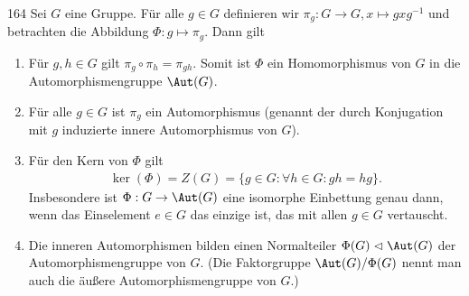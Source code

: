 \begin{algebraUE}{164}
Sei $G$ eine Gruppe. Für alle $g \in G$ definieren wir $\pi_g: G \rightarrow G, x \mapsto gxg^{-1}$
und betrachten die Abbildung $\Phi: g \mapsto \pi_g$. Dann gilt
\begin{enumerate}
  \item Für $g,h \in G$ gilt $\pi_g \circ \pi_h = \pi_{gh}$. Somit ist $\Phi$
  ein Homomorphismus von $G$ in die Automorphismengruppe $\Aut(G)$.
  \item Für alle $g \in G$ ist $\pi_g$ ein Automorphismus (genannt der durch
  Konjugation mit $g$ induzierte innere Automorphismus von $G$).
  \item Für den Kern von $\Phi$ gilt
  \begin{align*}
    \ker(\Phi) = Z(G) = \{g \in G: \forall h \in G: gh = hg\}.
  \end{align*}
  Insbesondere ist $\Phi: G \rightarrow \Aut(G)$ eine isomorphe Einbettung genau dann,
  wenn das Einselement $e \in G$ das einzige ist, das mit allen $g \in G$ vertauscht.
  \item Die inneren Automorphismen bilden einen Normalteiler $\Phi(G) \vartriangleleft \Aut(G)$
  der Automorphismengruppe von $G$. (Die Faktorgruppe $\Aut(G)/\Phi(G)$ nennt man
  auch die äußere Automorphismengruppe von $G$.)
\end{enumerate}
\end{algebraUE}
